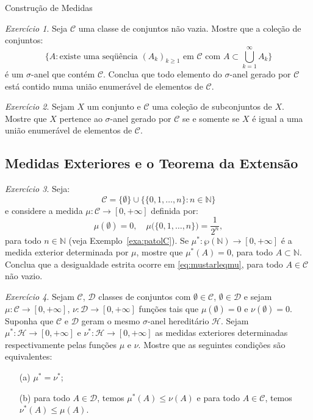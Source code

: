\documentclass[oneside,final,11pt]{amsbook}
\newcommand{\N}{\mathds N}
\theoremstyle{remark}\newtheorem{exercise}{Exercício}[chapter]
\theoremstyle{remark}\newtheorem{*exercise}[exercise]{\hbox to 0pt{\hskip 0pt minus 1fil*}Exercício}
\theoremstyle{definition}\newtheorem{exdefin}{Definição}[chapter]
\theoremstyle{plain}\newtheorem{teo}{Teorema}[section]
\theoremstyle{plain}\newtheorem{lem}[teo]{Lema}
\theoremstyle{plain}\newtheorem{prop}[teo]{Proposição}
\theoremstyle{plain}\newtheorem{cor}[teo]{Corolário}
\theoremstyle{definition}\newtheorem{defin}[teo]{Definição}
\theoremstyle{remark}\newtheorem{rem}[teo]{Observação}
\theoremstyle{definition}\newtheorem{notation}[teo]{Notação}
\theoremstyle{definition}\newtheorem{convention}[teo]{Convenção}
\theoremstyle{definition}\newtheorem{example}[teo]{Exemplo}
\numberwithin{section}{chapter}
\numberwithin{equation}{section}
\begin{document}
\begin{chapter}{Construção de Medidas}
\begin{exercise}\label{exe:sigmanoheredit}
Seja $\mathcal C$ uma classe de conjuntos não vazia. Mostre que a coleção de conjuntos:
\[\Big\{A:\text{existe uma seqüência $(A_k)_{k\ge1}$ em $\mathcal C$ com $A\subset\bigcup_{k=1}^\infty A_k$}\Big\}\]
é um $\sigma$-anel que contém $\mathcal C$. Conclua que todo elemento do $\sigma$-anel
gerado por $\mathcal C$ está contido numa união enumerável de elementos de $\mathcal C$.
\end{exercise}

\begin{exercise}\label{exe:Xnosigmaneluncount}
Sejam $X$ um conjunto e $\mathcal C$ uma coleção de subconjuntos de $X$.
Mostre que $X$ pertence ao $\sigma$-anel gerado por $\mathcal C$ se e somente se
$X$ é igual a uma união enumerável de elementos de $\mathcal C$.
\end{exercise}

\subsection*{Medidas Exteriores e o Teorema da Extensão}

\begin{exercise}\label{exe:mustarlessmu}
Seja:
\[\mathcal C=\{\emptyset\}\cup\big\{\{0,1,\ldots,n\}:n\in\N\big\}\]
e considere a medida $\mu:\mathcal C\to[0,+\infty]$ definida por:
\[\mu(\emptyset)=0,\quad\mu\big(\{0,1,\ldots,n\}\big)=\frac1{2^n},\]
para todo $n\in\N$ (veja Exemplo~\ref{exa:patolC}).
Se $\mu^*:\wp(\N)\to[0,+\infty]$ é a medida exterior determinada por $\mu$,
mostre que $\mu^*(A)=0$, para todo $A\subset\N$. Conclua que a desigualdade estrita ocorre em \eqref{eq:mustarleqmu},
para todo $A\in\mathcal C$ não vazio.
\end{exercise}

\begin{exercise}
Sejam $\mathcal C$, $\mathcal D$ classes de conjuntos com $\emptyset\in\mathcal C$, $\emptyset\in\mathcal D$
e sejam $\mu:\mathcal C\to[0,+\infty]$, $\nu:\mathcal D\to[0,+\infty]$ funções tais que $\mu(\emptyset)=0$
e $\nu(\emptyset)=0$. Suponha que $\mathcal C$ e $\mathcal D$ geram o mesmo $\sigma$-anel hereditário
$\mathcal H$. Sejam $\mu^*:\mathcal H\to[0,+\infty]$ e $\nu^*:\mathcal H\to[0,+\infty]$
as medidas exteriores determinadas respectivamente pelas funções $\mu$ e $\nu$.
Mostre que as seguintes condições são equivalentes:
\begin{itemize}
\item[(a)] $\mu^*=\nu^*$;
\item[(b)] para todo $A\in\mathcal D$, temos $\mu^*(A)\le\nu(A)$ e para todo $A\in\mathcal C$, temos $\nu^*(A)\le\mu(A)$.
\end{itemize}
\end{exercise}


\end{chapter}
\end{document}
